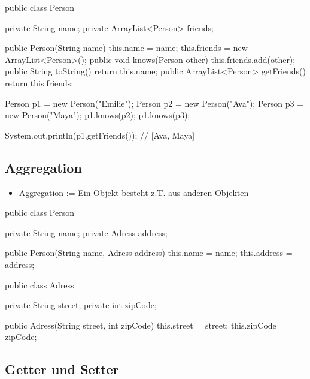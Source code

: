 \documentclass[a4paper,10pt, dvipsnames]{report}
\begin{document}
\begin{javacodebox}
public class Person {

    private String name;
    private ArrayList<Person> friends;

    public Person(String name) {
        this.name = name;
        this.friends = new ArrayList<Person>();
    }
    public void knows(Person other) {
        this.friends.add(other);
    }
    public String toString() {
        return this.name;
    }
    public ArrayList<Person> getFriends() {
        return this.friends;
    }
}
\end{javacodebox}

\begin{javacodebox}
Person p1 = new Person("Emilie");
Person p2 = new Person("Ava");
Person p3 = new Person("Maya");
p1.knows(p2);
p1.knows(p3);

System.out.println(p1.getFriends()); // [Ava, Maya]
\end{javacodebox}


\subsection{Aggregation}

\begin{itemize}
    \item Aggregation := Ein Objekt besteht z.T. aus anderen Objekten
\end{itemize}

\begin{javacodebox}
    public class Person {

    private String name;
    private Adress address;

    public Person(String name, Adress address) {
        this.name = name;
        this.address = address;
    }
}
\end{javacodebox}

\begin{javacodebox}
    public class Adress {

    private String street;
    private int zipCode;

    public Adress(String street, int zipCode) {
        this.street = street;
        this.zipCode = zipCode;
    }
}
\end{javacodebox}


\subsection{Getter und Setter}
\end{document}
